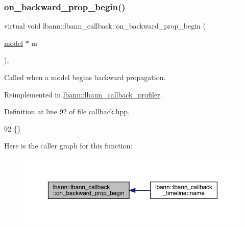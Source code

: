 \subsubsection{\texorpdfstring{on\+\_\+backward\+\_\+prop\+\_\+begin()}{on\_backward\_prop\_begin()}\hspace{0.1cm}{\footnotesize\ttfamily [1/2]}}
{\footnotesize\ttfamily virtual void lbann\+::lbann\+\_\+callback\+::on\+\_\+backward\+\_\+prop\+\_\+begin (\begin{DoxyParamCaption}\item[{\hyperlink{classlbann_1_1model}{model} $\ast$}]{m }\end{DoxyParamCaption})\hspace{0.3cm}{\ttfamily [inline]}, {\ttfamily [virtual]}}

Called when a model begins backward propagation. 

Reimplemented in \hyperlink{classlbann_1_1lbann__callback__profiler_a7905ac8f79a71731c8e388cdb4385023}{lbann\+::lbann\+\_\+callback\+\_\+profiler}.



Definition at line 92 of file callback.\+hpp.


\begin{DoxyCode}
92 \{\}
\end{DoxyCode}
Here is the caller graph for this function\+:\nopagebreak
\begin{figure}[H]
\begin{center}
\leavevmode
\includegraphics[width=350pt]{classlbann_1_1lbann__callback_a2c0709a26179d115ff85b7561786ee27_icgraph}
\end{center}
\end{figure}
\mbox{\label{classlbann_1_1lbann__callback_abeb1e486e259fd358332abf1e952f630}} 
